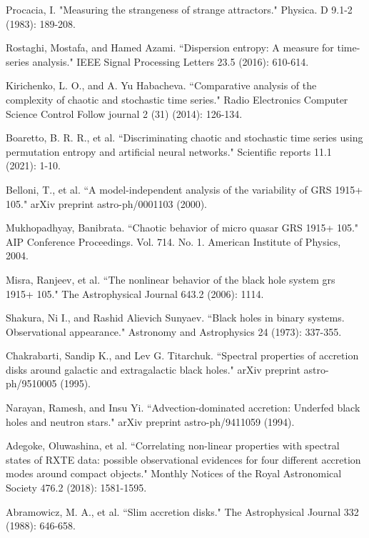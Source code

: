 \documentclass[journal]{IEEEtran}
\begin{document}
	\begin{thebibliography}{1}
		Procacia, I. "Measuring the strangeness of strange attractors." Physica. D 9.1-2 (1983): 189-208.

		Rostaghi, Mostafa, and Hamed Azami. ``Dispersion entropy: A measure for time-series analysis." IEEE Signal Processing Letters 23.5 (2016): 610-614.

Kirichenko, L. O., and A. Yu Habacheva. ``Comparative analysis of the complexity of chaotic and stochastic time series." Radio Electronics Computer Science Control  Follow journal 2 (31) (2014): 126-134.

Boaretto, B. R. R., et al. ``Discriminating chaotic and stochastic time series using permutation entropy and artificial neural networks." Scientific reports 11.1 (2021): 1-10.

Belloni, T., et al. ``A model-independent analysis of the variability of GRS 1915+ 105." arXiv preprint astro-ph/0001103 (2000).

Mukhopadhyay, Banibrata. ``Chaotic behavior of micro quasar GRS 1915+ 105." AIP Conference Proceedings. Vol. 714. No. 1. American Institute of Physics, 2004.

Misra, Ranjeev, et al. ``The nonlinear behavior of the black hole system grs 1915+ 105." The Astrophysical Journal 643.2 (2006): 1114.

Shakura, Ni I., and Rashid Alievich Sunyaev. ``Black holes in binary systems. Observational appearance." Astronomy and Astrophysics 24 (1973): 337-355.

Chakrabarti, Sandip K., and Lev G. Titarchuk. ``Spectral properties of accretion disks around galactic and extragalactic black holes." arXiv preprint astro-ph/9510005 (1995).

Narayan, Ramesh, and Insu Yi. ``Advection-dominated accretion: Underfed black holes and neutron stars." arXiv preprint astro-ph/9411059 (1994).

Adegoke, Oluwashina, et al. ``Correlating non-linear properties with spectral states of RXTE data: possible observational evidences for four different accretion modes around compact objects." Monthly Notices of the Royal Astronomical Society 476.2 (2018): 1581-1595.

Abramowicz, M. A., et al. ``Slim accretion disks." The Astrophysical Journal 332 (1988): 646-658.


\end{thebibliography}
\end{document}

